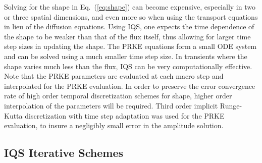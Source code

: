 \documentclass{elsarticle}
\newcommand{\eqt}[1]{Eq.~(\ref{#1})}                     %
\newcommand{\fig}[1]{Fig.~\ref{#1}}                      %
\begin{document}
Solving for the shape in \eqt{eq:shape} can become expensive, especially in two or three spatial dimensions, and even more so when using 
the transport equations in lieu of the diffusion equations.  Using IQS, one expects the time dependence of the shape to be weaker than that 
of the flux itself, thus allowing for larger time step sizes in updating the shape. The PRKE equations form a small ODE system and can be 
solved using a much smaller time step size. In transients where the shape varies much less than the flux, IQS can be very computationally effective. 
%
Note that the PRKE parameters are evaluated at each macro step and interpolated for the PRKE evaluation. In order to preserve 
the error convergence rate of high order temporal discretization schemes for shape, higher order interpolation of the parameters will be required. Third order implicit Runge-Kutta discretization with time step adaptation was used for the PRKE evaluation, to insure a negligibly small error in the amplitude solution.

\subsection{IQS Iterative Schemes}
\label{sect:iter}
\end{document}
